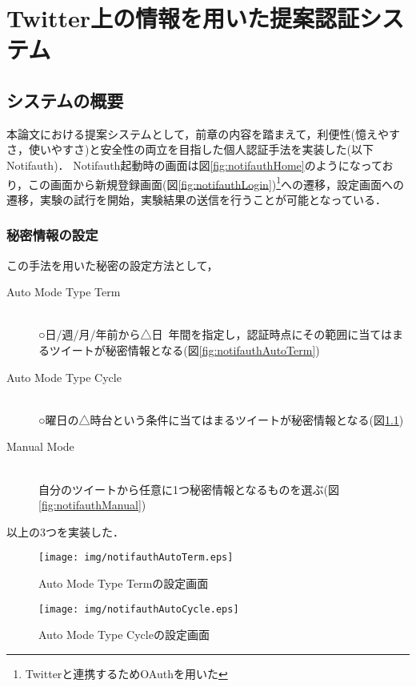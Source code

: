 \chapter{Twitter上の情報を用いた提案認証システム}\label{chap:system}
\section{システムの概要}
本論文における提案システムとして，前章の内容を踏まえて，利便性(憶えやすさ，使いやすさ)と安全性の両立を目指した個人認証手法を実装した(以下Notifauth)．
Notifauth起動時の画面は図\ref{fig:notifauthHome}のようになっており，この画面から新規登録画面(図\ref{fig:notifauthLogin})\footnote{Twitterと連携するためOAuthを用いた}への遷移，設定画面への遷移，実験の試行を開始，実験結果の送信を行うことが可能となっている．

\subsection{秘密情報の設定}\label{subsec:selectSecret}
この手法を用いた秘密の設定方法として，
\begin{description}
  \item[Auto Mode Type Term]\mbox{}\\
    ○日/週/月/年前から△日~年間を指定し，認証時点にその範囲に当てはまるツイートが秘密情報となる(図\ref{fig:notifauthAutoTerm})
  \item[Auto Mode Type Cycle]\mbox{}\\
    ○曜日の△時台という条件に当てはまるツイートが秘密情報となる(図\ref{fig:notifauthAutoCycle})
  \item[Manual Mode]\mbox{}\\
    自分のツイートから任意に1つ秘密情報となるものを選ぶ(図\ref{fig:notifauthManual})
\end{description}
以上の3つを実装した．

\begin{figure}[ht]
  \begin{minipage}{0.5\hsize}
    \begin{center}
      \texttt{[image: img/notifauthAutoTerm.eps]}
    \end{center}
    \caption{Auto Mode Type Termの設定画面}
    \label{fig:notifauthAutoTerm}
  \end{minipage}
  \begin{minipage}{0.5\hsize}
    \begin{center}
      \texttt{[image: img/notifauthAutoCycle.eps]}
    \end{center}
    \caption{Auto Mode Type Cycleの設定画面}
    \label{fig:notifauthAutoCycle}
  \end{minipage}
\end{figure}

